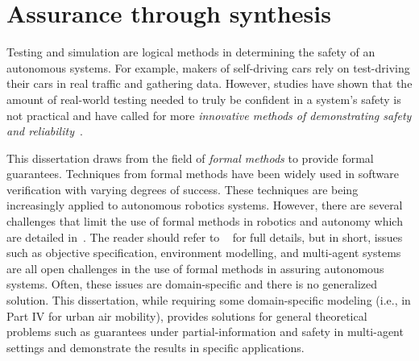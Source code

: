 








\section{Assurance through synthesis}

Testing and simulation are logical methods in determining the safety of an autonomous systems. For example, makers of self-driving cars rely on test-driving their cars in real traffic and gathering data. However, studies have shown that the amount of real-world testing needed to truly be confident in a system's safety is not practical and have called for more \emph{innovative methods of demonstrating safety and reliability}~\cite{KALRA2016182}. 

This dissertation draws from the field of \emph{formal methods} to provide formal guarantees. Techniques from formal methods have been widely used in software verification with varying degrees of success. These techniques are being increasingly applied to autonomous robotics systems. However, there are several challenges that limit the use of formal methods in robotics and autonomy which are detailed in~\cite{10.1145/3342355}. The reader should refer to ~\cite{10.1145/3342355} for full details, but in short, issues such as objective specification, environment modelling, and multi-agent systems are all open challenges in the use of formal methods in assuring autonomous systems. Often, these issues are domain-specific and there is no generalized solution. This dissertation, while requiring some domain-specific modeling (i.e., in Part IV for urban air mobility), provides solutions for general theoretical problems such as guarantees under partial-information and safety in multi-agent settings and demonstrate the results in specific applications. 

